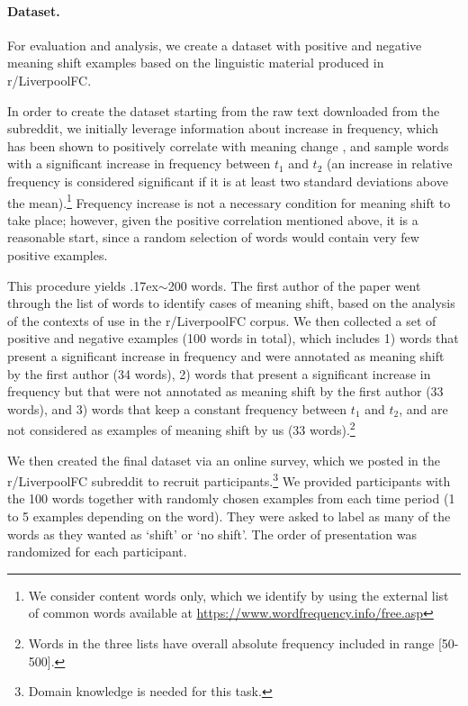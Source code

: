 \paragraph{Dataset.} For evaluation and analysis, we create a dataset
with positive and negative meaning shift examples based on the
linguistic material produced in r/LiverpoolFC.

In order to create the dataset starting from the raw text downloaded
from the subreddit, we initially leverage information about increase
in frequency, which has been shown to positively correlate with
meaning change
\cite{wijaya2011understanding,kulkarni2015statistically}, and sample
words with a significant increase in frequency between $t_1$ and $t_2$
(an increase in relative frequency is considered significant if it is
at least two standard deviations above the mean).\footnote{We consider
  content words only, which we identify by using the external list
  of common words available at
  \url{https://www.wordfrequency.info/free.asp}} Frequency increase is
not a necessary condition for meaning shift to take place; however,
given the positive correlation mentioned above, it is a reasonable
start, since a random selection of words would contain very few
positive examples.

This procedure yields {\raise.17ex\hbox{$\scriptstyle\sim$}}200 words.
The first author of the paper went through the list of words to
identify cases of meaning shift, based on the analysis of the contexts
of use in the r/LiverpoolFC corpus. We then collected a set of positive
and negative examples (100 words in total), which includes 1) words
that present a significant increase in frequency and were annotated as
meaning shift by the first author (34 words), 2) words that present a
significant increase in frequency but that were not annotated as
meaning shift by the first author (33 words), and 3) words that keep a
constant frequency between $t_1$ and $t_2$, and are not considered as
examples of meaning shift by us (33 words).\footnote{Words in the three lists have overall absolute frequency included in range [50-500].}

We then created the final dataset via an online survey, which we posted
in the r/LiverpoolFC subreddit to recruit participants.\footnote{Domain knowledge is needed for this task.} 
We provided participants with the 100 words
together with randomly chosen examples from each time period (1 to 5
examples depending on the word). They were asked to label as many of
the words as they wanted as `shift' or `no shift'. The order of presentation
was randomized for each participant.

